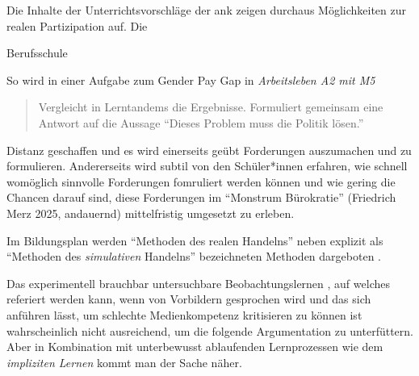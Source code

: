 Die Inhalte der Unterrichtsvorschläge der \gls{ank} zeigen durchaus Möglichkeiten zur realen Partizipation auf. Die  

Berufsschule 

So wird in einer Aufgabe zum Gender Pay Gap in \emph{Arbeitsleben A2 mit M5}

\begin{quote}
    Vergleicht in Lerntandems die Ergebnisse. Formuliert gemeinsam eine Antwort auf die Aussage \enquote{Dieses Problem muss die Politik lösen.}
\end{quote}

Distanz geschaffen und es wird einerseits geübt Forderungen auszumachen und zu formulieren. Andererseits wird subtil von den Schüler*innen erfahren, wie schnell womöglich sinnvolle Forderungen fomruliert werden können und wie gering die Chancen darauf sind, diese Forderungen im \enquote{Monstrum Bürokratie} (Friedrich Merz 2025, andauernd) mittelfristig umgesetzt zu erleben. 

Im Bildungsplan werden \enquote{Methoden des realen Handelns} \autocite[13]{bplan} neben explizit als \enquote{Methoden des \emph{simulativen} Handelns} bezeichneten Methoden dargeboten \autocite[14]{bplan}.

Das experimentell brauchbar untersuchbare Beobachtungslernen \autocite{Bandura.1977}, auf welches referiert werden kann, wenn von Vorbildern gesprochen wird und das sich anführen lässt, um schlechte Medienkompetenz kritisieren zu können ist wahrscheinlich nicht ausreichend, um die folgende Argumentation zu unterfüttern.
Aber in Kombination mit unterbewusst ablaufenden Lernprozessen wie dem \emph{impliziten Lernen} \autocite[82-93]{Kiesel2012} kommt man der Sache näher.






